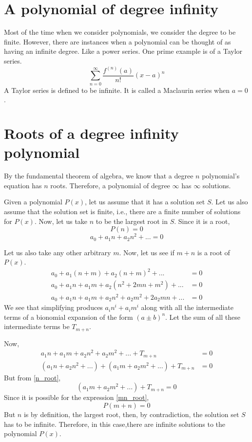\documentclass[preprint,12pt]{elsarticle}
\begin{document}
\section{A polynomial of degree infinity}

Most of the time when we consider polynomials, we consider the degree to be finite.
However, there are instances when a polynomial can be thought of as having an infinite degree. Like a power series.
One prime example is of a Taylor series.\cite{1137203}
\[
    \sum_{n = 0}^{\infty} \frac{f^{(n)} (a)}{n!} (x-a)^n
\]
A Taylor series is defined to be infinite.
It is called a Maclaurin series when $a = 0$.
\label{S:2}
\section{Roots of a degree infinity polynomial}
By the fundamental theorem of algebra, we know that a degree $n$ polynomial's equation has $n$ roots.
Therefore, a polynomial of degree $\infty$ has $\infty$ solutions.

Given a polynomial $P(x)$, let us assume that it has a solution set $S$.
Let us also assume that the solution set is finite, i.e., there are a finite number of solutions for $P(x)$.
Now, let us take $n$ to be the largest root in $S$.
Since it is a root, 
\[
    P(n) = 0
\]
\begin{equation} \label{n_root}
     a_0 + a_1n + a_2n^2 + ... = 0
\end{equation}
   
Let us also take any other arbitrary $m$.
Now, let us see if $m + n$ is a root of $P(x)$.
\begin{align*}
    a_0 + a_1(n + m) + a_2(n + m)^2 + ... &= 0\\
    a_0 + a_1n + a_1m + a_2(n^2 + 2mn + m^2) + ... &= 0\\
    a_0 + a_1n + a_1m + a_2n^2 + a_2m^2 + 2a_2mn + ... &= 0
\end{align*}
We see that simplifying produces $a_in^i + a_im^i$ along with all the intermediate terms of a bionomial expansion of the form $(a \pm b)^n$.
Let the sum of all these intermediate terms be $T_{m + n}$.

Now, 
\begin{align*}
    a_1n + a_1m + a_2n^2 + a_2m^2 + ... + T_{m+n} &= 0\\
    (a_1n + a_2n^2 + ...) + (a_1m + a_2m^2 + ...) + T_{m+n} &= 0
\end{align*}
But from \ref{n_root}, 
\begin{equation} \label{mn_root}
    (a_1m + a_2m^2 + ...) + T_{m+n} = 0
\end{equation}
Since it is possible for the expression \ref{mn_root}, 
\[P(m+n)=0\]
But $n$ is by definition, the largest root, then, by contradiction, the solution set $S$ has to be infinite.
Therefore, in this case,there are infinite solutions to the polynomial $P(x)$.
\end{document}
